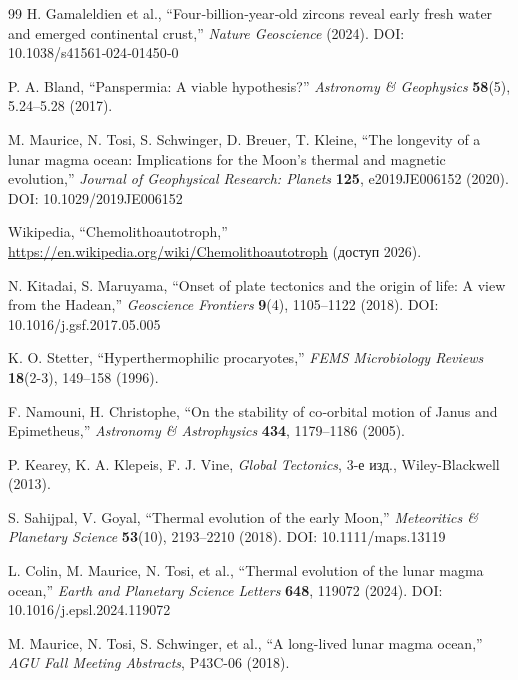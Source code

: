 \documentclass[11pt,a4paper]{article}
\begin{document}
\begin{thebibliography}{99}
		H. Gamaleldien et al., ``Four‑billion‑year‑old zircons reveal early fresh water and emerged continental crust,''
		\emph{Nature Geoscience} (2024). DOI: 10.1038/s41561‑024‑01450‑0
		
		P. A. Bland, ``Panspermia: A viable hypothesis?''
		\emph{Astronomy \& Geophysics} \textbf{58}(5), 5.24–5.28 (2017).
		
		M. Maurice, N. Tosi, S. Schwinger, D. Breuer, T. Kleine, ``The longevity of a lunar magma ocean: Implications for the Moon's thermal and magnetic evolution,''
		\emph{Journal of Geophysical Research: Planets} \textbf{125}, e2019JE006152 (2020). DOI: 10.1029/2019JE006152
		
		Wikipedia, ``Chemolithoautotroph,''
		\url{https://en.wikipedia.org/wiki/Chemolithoautotroph} (доступ 2026).
		
		N. Kitadai, S. Maruyama, ``Onset of plate tectonics and the origin of life: A view from the Hadean,''
		\emph{Geoscience Frontiers} \textbf{9}(4), 1105–1122 (2018). DOI: 10.1016/j.gsf.2017.05.005
		
		K. O. Stetter, ``Hyperthermophilic procaryotes,''
		\emph{FEMS Microbiology Reviews} \textbf{18}(2-3), 149–158 (1996).
		
		F. Namouni, H. Christophe, ``On the stability of co‑orbital motion of Janus and Epimetheus,''
		\emph{Astronomy \& Astrophysics} \textbf{434}, 1179–1186 (2005).
		
		P. Kearey, K. A. Klepeis, F. J. Vine, \emph{Global Tectonics}, 3-е изд., Wiley-Blackwell (2013).
		
		S. Sahijpal, V. Goyal, ``Thermal evolution of the early Moon,''
		\emph{Meteoritics \& Planetary Science} \textbf{53}(10), 2193–2210 (2018). DOI: 10.1111/maps.13119
		
		L. Colin, M. Maurice, N. Tosi, et al., ``Thermal evolution of the lunar magma ocean,''
		\emph{Earth and Planetary Science Letters} \textbf{648}, 119072 (2024). DOI: 10.1016/j.epsl.2024.119072
		
		M. Maurice, N. Tosi, S. Schwinger, et al., ``A long-lived lunar magma ocean,''
		\emph{AGU Fall Meeting Abstracts}, P43C-06 (2018).
		

\end{thebibliography}
\end{document}
